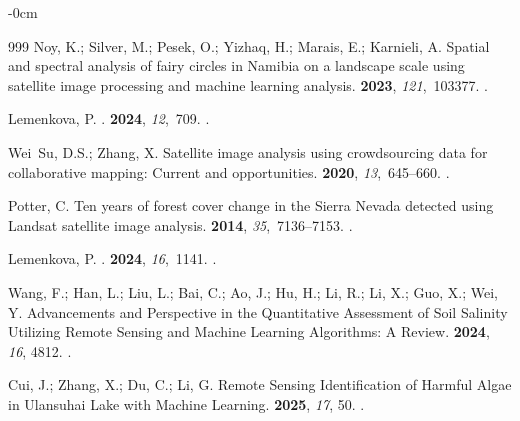 \documentclass[geomatics,article,accept,pdftex,oneauthor]{Definitions/mdpi}
\begin{document}
\begin{adjustwidth}{-\extralength}{0cm}
\begin{thebibliography}{999}
Noy, K.; Silver, M.; Pesek, O.; Yizhaq, H.; Marais, E.; Karnieli, A.
\newblock Spatial and spectral analysis of fairy circles in Namibia on a
  landscape scale using satellite image processing and machine learning
  analysis.
 {\bf 2023}, {\em 121},~103377.
.

Lemenkova, P.
.
 {\bf 2024}, {\em
  12},~709.
.

Wei~Su, D.S.; Zhang, X.
\newblock Satellite image analysis using crowdsourcing data for collaborative
  mapping: Current and opportunities.
 {\bf 2020}, {\em
  13},~645--660.
.

Potter, C.
\newblock Ten years of forest cover change in the Sierra Nevada detected using
  Landsat satellite image analysis.
 {\bf 2014}, {\em
  35},~7136--7153.
.

Lemenkova, P.
.
 {\bf 2024}, {\em 16},~1141.
.

Wang, F.; Han, L.; Liu, L.; Bai, C.; Ao, J.; Hu, H.; Li, R.; Li, X.; Guo, X.;
  Wei, Y.
\newblock Advancements and Perspective in the Quantitative Assessment of Soil
  Salinity Utilizing Remote Sensing and Machine Learning Algorithms: A Review.
 {\bf 2024}, {\em 16}, 4812.
.

Cui, J.; Zhang, X.; Du, C.; Li, G.
\newblock Remote Sensing Identification of Harmful Algae in Ulansuhai Lake with
  Machine Learning.
 {\bf 2025}, {\em 17}, 50.
.


\end{thebibliography}
\end{adjustwidth}
\end{document}
